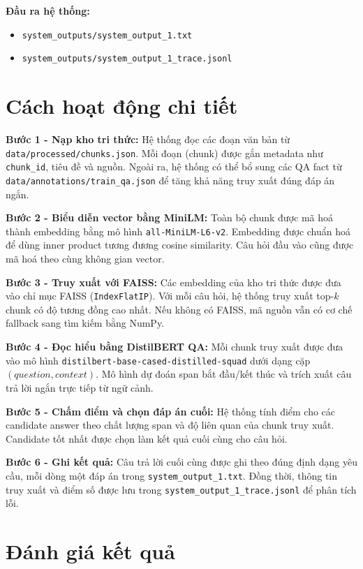 \documentclass[12pt,a4paper]{report}
\begin{document}
\textbf{Đầu ra hệ thống:}
\begin{itemize}
    \item \texttt{system\_outputs/system\_output\_1.txt}
    \item \texttt{system\_outputs/system\_output\_1\_trace.jsonl}
\end{itemize}

\section{Cách hoạt động chi tiết}

\textbf{Bước 1 - Nạp kho tri thức:}
Hệ thống đọc các đoạn văn bản từ \texttt{data/processed/chunks.json}. Mỗi đoạn (chunk) được gắn metadata như \texttt{chunk\_id}, tiêu đề và nguồn. Ngoài ra, hệ thống có thể bổ sung các QA fact từ \texttt{data/annotations/train\_qa.json} để tăng khả năng truy xuất đúng đáp án ngắn.

\textbf{Bước 2 - Biểu diễn vector bằng MiniLM:}
Toàn bộ chunk được mã hoá thành embedding bằng mô hình \texttt{all-MiniLM-L6-v2}. Embedding được chuẩn hoá để dùng inner product tương đương cosine similarity. Câu hỏi đầu vào cũng được mã hoá theo cùng không gian vector.

\textbf{Bước 3 - Truy xuất với FAISS:}
Các embedding của kho tri thức được đưa vào chỉ mục FAISS (\texttt{IndexFlatIP}). Với mỗi câu hỏi, hệ thống truy xuất top-\(k\) chunk có độ tương đồng cao nhất. Nếu không có FAISS, mã nguồn vẫn có cơ chế fallback sang tìm kiếm bằng NumPy.

\textbf{Bước 4 - Đọc hiểu bằng DistilBERT QA:}
Mỗi chunk truy xuất được đưa vào mô hình \texttt{distilbert-base-cased-distilled-squad} dưới dạng cặp \((question, context)\). Mô hình dự đoán span bắt đầu/kết thúc và trích xuất câu trả lời ngắn trực tiếp từ ngữ cảnh.

\textbf{Bước 5 - Chấm điểm và chọn đáp án cuối:}
Hệ thống tính điểm cho các candidate answer theo chất lượng span và độ liên quan của chunk truy xuất. Candidate tốt nhất được chọn làm kết quả cuối cùng cho câu hỏi.

\textbf{Bước 6 - Ghi kết quả:}
Câu trả lời cuối cùng được ghi theo đúng định dạng yêu cầu, mỗi dòng một đáp án trong \texttt{system\_output\_1.txt}. Đồng thời, thông tin truy xuất và điểm số được lưu trong \texttt{system\_output\_1\_trace.jsonl} để phân tích lỗi.

\section{Đánh giá kết quả}
\end{document}
